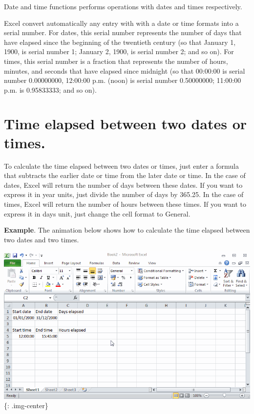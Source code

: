 Date and time functions performs operations with dates and times respectively.

Excel convert automatically any entry with with a date or time formats into a serial number. For dates, this serial number represents the number of days that have elapsed since the beginning of the twentieth century (so that January 1, 1900, is serial number 1; January 2, 1900, is serial number 2; and so on). For times, this serial number is a fraction that represents the number of hours, minutes, and seconds that have elapsed since midnight (so that 00:00:00 is serial number 0.00000000, 12:00:00 p.m. (noon) is serial number 0.50000000; 11:00:00 p.m. is 0.95833333; and so on).

\section{Time elapsed between two dates or times.}
\label{timeelapsedbetweentwodatesortimes.}

To calculate the time elapsed between two dates or times, just enter a formula that subtracts the earlier date or time from the later date or time.
In the case of dates, Excel will return the number of days between these dates. If you want to express it in year units, just divide the number of days by 365.25. In the case of times, Excel will return the number of hours between these times. If you want to express it in days unit, just change the cell format to General. 

\textbf{Example}. The animation below shows how to calculate the time elapsed between two dates and two times.

\includegraphics[keepaspectratio,width=\textwidth,height=0.75\textheight]{img/example_time_elapsed.gif}
\{: .img-center\}

